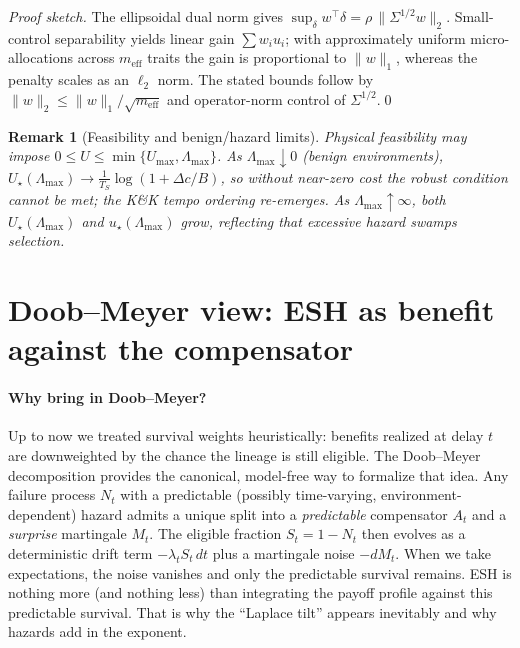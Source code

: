 \documentclass[11pt]{article}
\theoremstyle{upright}
\newtheorem{remark}{Remark}
\newcommand{\horizon}{\Lambda}
\newcommand{\Lmax}{\horizon^{(T)}_{\max}}
\renewcommand{\Lmax}{\Lambda_{\max}}
\begin{document}
\noindent\emph{Proof sketch.}
The ellipsoidal dual norm gives $\sup_\delta w^\top\delta=\rho\,\|\Sigma^{1/2}w\|_2$.
Small-control separability yields linear gain $\sum w_i u_i$; with approximately uniform micro-allocations across
$m_{\mathrm{eff}}$ traits the gain is proportional to $\|w\|_1$, whereas the penalty scales as an $\ell_2$ norm.
The stated bounds follow by $\|w\|_2\le \|w\|_1/\sqrt{m_{\mathrm{eff}}}$ and operator-norm control of $\Sigma^{1/2}$.\qed

\begin{remark}[Feasibility and benign/hazard limits]
Physical feasibility may impose $0\le U\le \min\{U_{\max},\Lmax\}$.
As $\Lmax\downarrow 0$ (benign environments), $U_\star(\Lmax)\to \tfrac{1}{T_S}\log(1+\Delta c/B)$,
so without near-zero cost the robust condition cannot be met; the K\&K tempo ordering re-emerges.
As $\Lmax\uparrow\infty$, both $U_\star(\Lmax)$ and $u_\star(\Lmax)$ grow, reflecting that excessive hazard swamps selection.
\end{remark}

\section{Doob--Meyer view: ESH as benefit against the compensator}
\label{sec:doob-meyer}

\paragraph{Why bring in Doob--Meyer?}
Up to now we treated survival weights heuristically: benefits realized at delay $t$ are downweighted by the chance the lineage is still eligible. The Doob--Meyer decomposition provides the canonical, model-free way to formalize that idea. Any failure process $N_t$ with a predictable (possibly time-varying, environment-dependent) hazard admits a unique split into a \emph{predictable} compensator $A_t$ and a \emph{surprise} martingale $M_t$. The eligible fraction $S_t=1-N_t$ then evolves as a deterministic drift term $-\lambda_t S_t\,dt$ plus a martingale noise $-dM_t$. When we take expectations, the noise vanishes and only the predictable survival remains. ESH is nothing more (and nothing less) than integrating the payoff profile against this predictable survival. That is why the “Laplace tilt” appears inevitably and why hazards add in the exponent.
\end{document}
